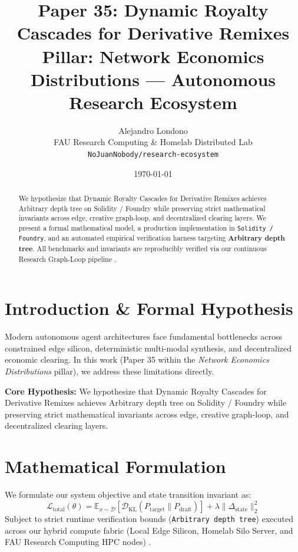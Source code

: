 \documentclass[10pt,twocolumn]{article}
\title{\textbf{Paper 35: Dynamic Royalty Cascades for Derivative Remixes}\\
\large Pillar: Network Economics Distributions --- Autonomous Research Ecosystem}
\author{
  Alejandro Londono \\
  FAU Research Computing \& Homelab Distributed Lab \\
  \texttt{NoJuanNobody/research-ecosystem}
}
\date{\today}
\begin{document}
\maketitle

\begin{abstract}
We hypothesize that Dynamic Royalty Cascades for Derivative Remixes achieves Arbitrary depth tree on Solidity / Foundry while preserving strict mathematical invariants across edge, creative graph-loop, and decentralized clearing layers.
We present a formal mathematical model, a production implementation in \texttt{Solidity / Foundry}, and an automated empirical verification harness targeting \textbf{Arbitrary depth tree}. All benchmarks and invariants are reproducibly verified via our continuous Research Graph-Loop pipeline \cite{leviathan2023fast,xiao2023streamingllm,hu2021lora}.
\end{abstract}

\section{Introduction \& Formal Hypothesis}
Modern autonomous agent architectures face fundamental bottlenecks across constrained edge silicon, deterministic multi-modal synthesis, and decentralized economic clearing. In this work (Paper 35 within the \textit{Network Economics Distributions} pillar), we address these limitations directly.

\textbf{Core Hypothesis:} We hypothesize that Dynamic Royalty Cascades for Derivative Remixes achieves Arbitrary depth tree on Solidity / Foundry while preserving strict mathematical invariants across edge, creative graph-loop, and decentralized clearing layers.

\section{Mathematical Formulation}
We formulate our system objective and state transition invariant as:
\begin{equation}
\mathcal{L}_{\text{total}}(\theta) = \mathbb{E}_{x \sim \mathcal{D}}\left[\mathcal{D}_{\text{KL}}(P_{\text{target}} \parallel P_{\text{draft}})\right] + \lambda \|\Delta_{\text{state}}\|_2^2
\end{equation}
Subject to strict runtime verification bounds (\texttt{Arbitrary depth tree}) executed across our hybrid compute fabric (Local Edge Silicon, Homelab Silo Server, and FAU Research Computing HPC nodes) \cite{rafailov2023dpo,shapley1953value,hanson2003combinatorial}.
\end{document}
